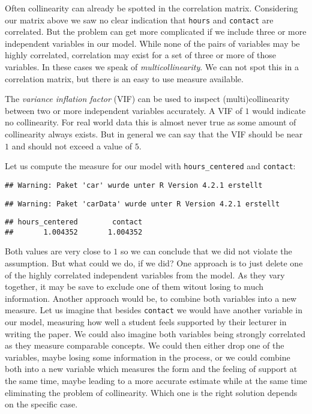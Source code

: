 \documentclass[
]{book}
\begin{document}
Often collinearity can already be spotted in the correlation matrix. Considering
our matrix above we saw no clear indication that \texttt{hours} and \texttt{contact} are
correlated. But the problem can get more complicated if we include three or more
independent variables in our model. While none of the pairs of variables may be
highly correlated, correlation may exist for a set of three or more of those
variables. In these cases we speak of \emph{multicollinearity}. We can not spot this
in a correlation matrix, but there is an easy to use measure available.

The \emph{variance inflation factor} (VIF) can be used to inspect (multi)collinearity
between two or more independent variables accurately. A VIF of \(1\) would
indicate no collinearity. For real world data this is almost never true as some
amount of collinearity always exists. But in general we can say that the VIF
should be near \(1\) and should not exceed a value of \(5\).

Let us compute the measure for our model with \texttt{hours\_centered} and \texttt{contact}:

\begin{verbatim}
## Warning: Paket 'car' wurde unter R Version 4.2.1 erstellt
\end{verbatim}

\begin{verbatim}
## Warning: Paket 'carData' wurde unter R Version 4.2.1 erstellt
\end{verbatim}

\begin{verbatim}
## hours_centered        contact 
##       1.004352       1.004352
\end{verbatim}

Both values are very close to \(1\) so we can conclude that we did not violate
the assumption. But what could we do, if we did? One approach is to just delete
one of the highly correlated independent variables from the model. As they vary
together, it may be save to exclude one of them witout losing to much
information. Another approach would be, to combine both variables into a new
measure. Let us imagine that besides \texttt{contact} we would have another variable in
our model, measuring how well a student feels supported by their lecturer in
writing the paper. We could also imagine both variables being strongly
correlated as they measure comparable concepts. We could then either drop one of
the variables, maybe losing some information in the process, or we could combine
both into a new variable which measures the form and the feeling of support at
the same time, maybe leading to a more accurate estimate while at the same time
eliminating the problem of collinearity. Which one is the right solution
depends on the specific case.
\end{document}
